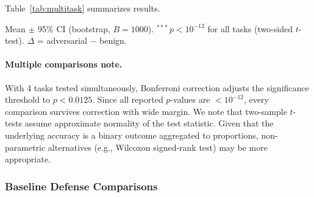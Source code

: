 \documentclass[10pt,twocolumn]{article}
\begin{document}
Table~\ref{tab:multitask} summarizes results.

\begin{table}[t]
\centering
\caption{Multi-Task Impact of Spectral Collapse}
\label{tab:multitask}
\small
{}

\vspace{2pt}
\begin{minipage}{\columnwidth}
{\footnotesize Mean $\pm$ 95\% CI (bootstrap, $B{=}1000$). $^{***}$\,$p < 10^{-12}$ for all tasks (two-sided $t$-test). $\Delta$ = adversarial $-$ benign.}
\end{minipage}
\end{table}

\paragraph{Multiple comparisons note.}
With 4 tasks tested simultaneously, Bonferroni correction adjusts the significance threshold to $p < 0.0125$. Since all reported $p$-values are $< 10^{-12}$, every comparison survives correction with wide margin. %
We note that two-sample $t$-tests assume approximate normality of the test statistic. Given that the underlying accuracy is a binary outcome aggregated to proportions, non-parametric alternatives (e.g., Wilcoxon signed-rank test) may be more appropriate. %

\subsubsection{Baseline Defense Comparisons}
\end{document}

